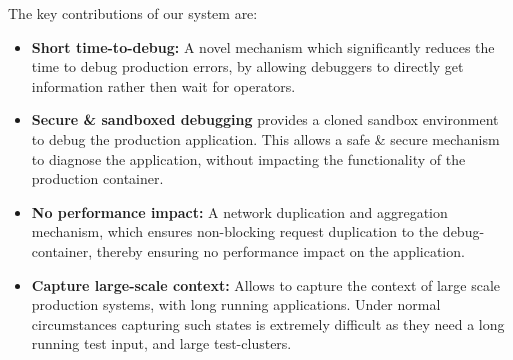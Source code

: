\noindent
The key contributions of our system are:
\begin{itemize}[leftmargin=*,topsep=0pt,itemsep=-1ex,partopsep=1ex,parsep=1ex]
\item \textbf{Short time-to-debug:} A novel mechanism which significantly reduces the time to debug production errors, by allowing debuggers to directly get information rather then wait for operators.
\item \textbf{Secure \& sandboxed debugging} \parikshan provides a cloned sandbox environment to debug the production application.
This allows a safe \& secure mechanism to diagnose the application, without impacting the functionality of the production container.
\item \textbf{No performance impact:} A network duplication and aggregation mechanism, which ensures non-blocking request duplication to the debug-container, thereby ensuring no performance impact on the application.
\item \textbf{Capture large-scale context:} Allows to capture the context of large scale production systems, with long running applications. Under normal circumstances capturing such states is extremely difficult as they need a long running test input, and large test-clusters.


\end{itemize}
\fi


